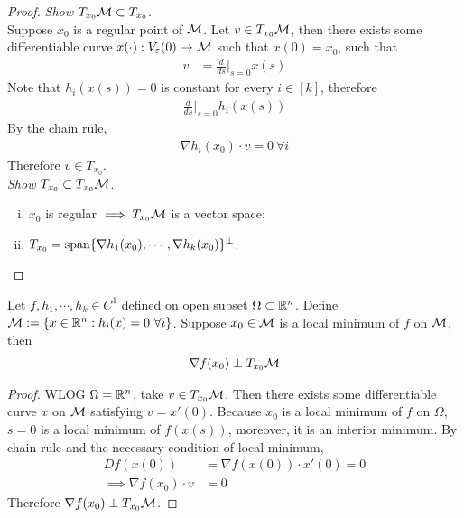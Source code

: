 \documentclass{article}
\begin{document}
   	\begin{proof}
   		\emph{Show} $T_{x_0} \mathcal{{M}} \subset T_{x_0}$.\\
   		Suppose $x_0$ is a regular point of $\mathcal{{M}}$.
   		Let $v \in T_{x_0} \mathcal{{M}}$, then there exists some differentiable curve $x(\cdot):V_\varepsilon(0) \to \mathcal{{M}}$ such that $x(0) = x_0$, such that
   		\begin{align}
   			v &= \frac{d}{ds} \bigg \vert_{s=0} x(s)
   		\end{align}
   		Note that $h_i(x(s)) = 0$ is constant for every $i \in [k]$, therefore
   		\begin{align}
   			\frac{d}{ds} \bigg \vert_{s=0} h_i(x(s))
   		\end{align}
   		By the chain rule, 
   		\begin{align}
   			\nabla h_i(x_0)\cdot v = 0\ \forall i
   		\end{align}
   		Therefore $v \in T_{x_0}$. \\
   		\emph{Show} $T_{x_0} \subset T_{x_0} \mathcal{{M}}$.
   		\begin{enumerate}[(i)]
   			\item $x_0$ is regular $\implies T_{x_0} \mathcal{{M}}$ is a vector space;
   			\item $T_{x_0} = \text{{span}}\{\nabla h_1 (x_0), \cdots, \nabla h_k(x_0)\}^\perp$.
   		\end{enumerate}
   	\end{proof}
   	
   	\begin{lemma}
   		Let $f, h_1, \cdots, h_k \in C^1$ defined on open subset $\Omega \subset \mathbb{R}^n$. Define $\mathcal{{M}} := \{x \in \mathbb{R}^n: h_i(x) = 0\ \forall i \}$. Suppose $x_0 \in \mathcal{{M}}$ is a local minimum of $f$ on $\mathcal{{M}}$, then 
   		\begin{align}
   			\nabla f(x_0) \perp T_{x_0} \mathcal{{M}}
   		\end{align}
   	\end{lemma}
   	
   	\begin{proof}
   		WLOG $\Omega = \mathbb{R}^n$, take $v \in T_{x_0} \mathcal{{M}}$. Then there exists some differentiable curve $x$ on $\mathcal{{M}}$ satisfying $v = x'(0)$. Because $x_0$ is a local minimum of $f$ on $\Omega$, $s=0$ is a local minimum of $f(x(s))$, moreover, it is an interior minimum. By chain rule and the necessary condition of local minimum,
   		\begin{align}
   			D f(x(0)) &= \nabla f (x(0)) \cdot x'(0) = 0 \\
   			\implies \nabla f(x_0) \cdot v &= 0
   		\end{align}
   		Therefore $\nabla f(x_0) \perp T_{x_0} \mathcal{{M}}$.
   	\end{proof}
   	
\end{document}
